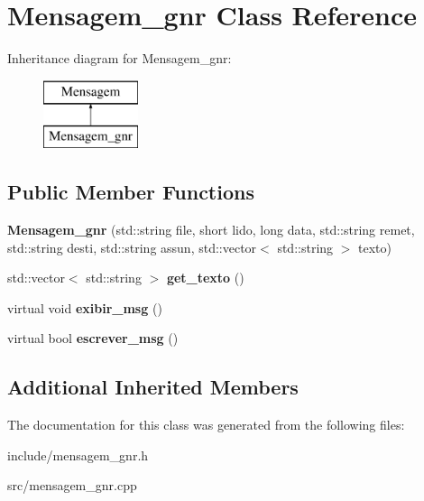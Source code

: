 \hypertarget{class_mensagem__gnr}{}\section{Mensagem\+\_\+gnr Class Reference}
\label{class_mensagem__gnr}
Inheritance diagram for Mensagem\+\_\+gnr\+:\begin{figure}[H]
\begin{center}
\leavevmode
\includegraphics[height=2.000000cm]{class_mensagem__gnr}
\end{center}
\end{figure}
\subsection*{Public Member Functions}
\begin{DoxyCompactItemize}
\item 
\mbox{\label{class_mensagem__gnr_a051d31c29c7d6f2b3b613d871ed235f8}} 
{\bfseries Mensagem\+\_\+gnr} (std\+::string file, short lido, long data, std\+::string remet, std\+::string desti, std\+::string assun, std\+::vector$<$ std\+::string $>$ texto)
\item 
\mbox{\label{class_mensagem__gnr_a879ef3c97b520b5f1d52ba1a81f24f47}} 
std\+::vector$<$ std\+::string $>$ {\bfseries get\+\_\+texto} ()
\item 
\mbox{\label{class_mensagem__gnr_a6e22ee8d7803ffae2de50c37c11671e8}} 
virtual void {\bfseries exibir\+\_\+msg} ()
\item 
\mbox{\label{class_mensagem__gnr_a2f427f59efb6ba616304b02a287053ae}} 
virtual bool {\bfseries escrever\+\_\+msg} ()
\end{DoxyCompactItemize}
\subsection*{Additional Inherited Members}


The documentation for this class was generated from the following files\+:\begin{DoxyCompactItemize}
\item 
include/mensagem\+\_\+gnr.\+h\item 
src/mensagem\+\_\+gnr.\+cpp\end{DoxyCompactItemize}
